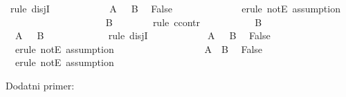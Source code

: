 \begin{isabellebody}
\begin{exercise}[subtitle=Pravilo ccontr i classical.]
\ {\isacharparenleft}{\kern0pt}rule\ disjI{}{\isacharparenright}{\kern0pt}\isanewline
\ \ \ \ \ \ \ \ \isamarkupfalse%
\ {\isacartoucheopen}{\isasymnot}\ {\isacharparenleft}{\kern0pt}{\isasymnot}\ A\ {\isasymor}\ {\isasymnot}\ B{\isacharparenright}{\kern0pt}{\isacartoucheclose}\ \isamarkupfalse%
\ False\ \isanewline
\ \ \ \ \ \ \ \ \ \ \isamarkupfalse%
\ {\isacharminus}{\kern0pt}\ {\isacharparenleft}{\kern0pt}erule\ notE{\isacharcomma}{\kern0pt}\ assumption{\isacharparenright}{\kern0pt}\isanewline
\ \ \ \ \ \ \isamarkupfalse%
\isanewline
\ \ \ \ \isamarkupfalse%
\ \isanewline
\ \ \ \ \ \ \isamarkupfalse%
\ B\isanewline
\ \ \ \ \ \ \isamarkupfalse%
\ {\isacharparenleft}{\kern0pt}rule\ ccontr{\isacharparenright}{\kern0pt}\isanewline
\ \ \ \ \ \ \ \ \isamarkupfalse%
\ {\isachardoublequoteopen}{\isasymnot}\ B{\isachardoublequoteclose}\isanewline
\ \ \ \ \ \ \ \ \isamarkupfalse%
\ \isamarkupfalse%
\ {\isachardoublequoteopen}{\isasymnot}\ A\ {\isasymor}\ {\isasymnot}\ B{\isachardoublequoteclose}\ \isanewline
\ \ \ \ \ \ \ \ \ \ \isamarkupfalse%
\ {\isacharparenleft}{\kern0pt}rule\ disjI{}{\isacharparenright}{\kern0pt}\isanewline
\ \ \ \ \ \ \ \ \isamarkupfalse%
\ {\isacartoucheopen}{\isasymnot}\ {\isacharparenleft}{\kern0pt}{\isasymnot}\ A\ {\isasymor}\ {\isasymnot}\ B{\isacharparenright}{\kern0pt}{\isacartoucheclose}\ \isamarkupfalse%
\ False\ \isanewline
\ \ \ \ \ \ \ \ \ \ \isamarkupfalse%
\ {\isacharminus}{\kern0pt}\ {\isacharparenleft}{\kern0pt}erule\ notE{\isacharcomma}{\kern0pt}\ assumption{\isacharparenright}{\kern0pt}\isanewline
\ \ \ \ \ \ \isamarkupfalse%
\isanewline
\ \ \ \ \isamarkupfalse%
\isanewline
\ \ \ \ \isamarkupfalse%
\ {\isacartoucheopen}{\isasymnot}\ {\isacharparenleft}{\kern0pt}A\ {\isasymand}\ B{\isacharparenright}{\kern0pt}{\isacartoucheclose}\ \isamarkupfalse%
\ False\ \isanewline
\ \ \ \ \ \ \isamarkupfalse%
\ {\isacharminus}{\kern0pt}\ {\isacharparenleft}{\kern0pt}erule\ notE{\isacharcomma}{\kern0pt}\ assumption{\isacharparenright}{\kern0pt}\isanewline
\ \ \isamarkupfalse%
\isanewline
{}\isamarkupfalse%
%
\endisatagproof
{\isafoldproof}%
%
\isadelimproof
%
\endisadelimproof
%
\begin{isamarkuptext}%
Dodatni primer:%
\end{isamarkuptext}\isamarkuptrue%

\end{exercise}
\end{isabellebody}
